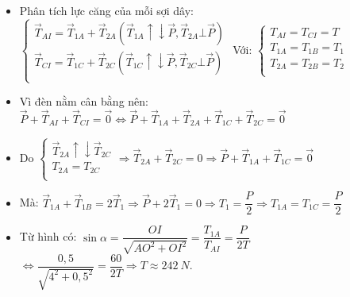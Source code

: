 \begin{vidu}
{\begin{itemize}
\begin{center}
\end{center}
\item Phân tích lực căng của mỗi sợi dây: 
$\begin{cases}
{\vec{T}}_{AI}={\vec{T}}_{1A}+{\vec{T}}_{2A}\left({\vec{T}}_{1A}\uparrow \downarrow \vec{P},{\vec{T}}_{2A}\bot \vec{P}\right)\\
{\vec{T}}_{CI}={\vec{T}}_{1C}+{\vec{T}}_{2C}\left({\vec{T}}_{1C}\uparrow \downarrow \vec{P},{\vec{T}}_{2C}\bot \vec{P}\right)\\
\end{cases}$
Với: $\begin{cases}
{T}_{AI}={T}_{CI}=T\\
{T}_{1A}={T}_{1B}={T}_{1}\\
{T}_{2A}={T}_{2B}={T}_{2}\\
\end{cases}$
\item Vì đèn nằm cân bằng nên: $\vec{P}+{\vec{T}}_{AI}+{\vec{T}}_{CI}=\vec 0\Leftrightarrow \vec{P}+{\vec{T}}_{1A}+{\vec{T}}_{2A}+{\vec{T}}_{1C}+{\vec{T}}_{2C}=\vec 0$
\item Do $\begin{cases}
{\vec{T}}_{2A}\uparrow \downarrow {\vec{T}}_{2C}\\
{T}_{2A}={T}_{2C}\\
\end{cases}\Rightarrow {\vec{T}}_{2A}+{\vec{T}}_{2C}=0\Rightarrow \vec{P}+{\vec{T}}_{1A}+{\vec{T}}_{1C}=\vec 0$
\item Mà: ${\vec{T}}_{1A}+{\vec{T}}_{1B}=2{\vec{T}}_{1}\Rightarrow \vec{P}+2{\vec{T}}_{1}=0\Rightarrow {T}_{1}=\dfrac{P}{2}\Rightarrow {T}_{1A}={T}_{1C}=\dfrac{P}{2}$
\item Từ hình có: $\sin \alpha =\dfrac{OI}{\sqrt{A{O}^{2}+O{I}^{2}}}=\dfrac{{T}_{1A}}{{T}_{AI}}=\dfrac{P}{2T}$
$\Leftrightarrow \dfrac{0,5}{\sqrt{{4}^{2}+0,{5}^{2}}}=\dfrac{60}{2T}\Rightarrow T\approx 242\ N$.
\end{itemize}
}
 \end{vidu}
